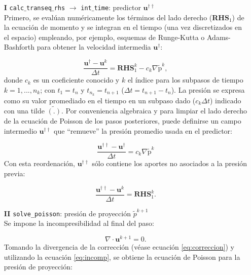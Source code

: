 \begin{enumerate}
\item[\textbf{I}] \texttt{calc$\_$transeq$\_$rhs} $\rightarrow$ \texttt{int$\_$time}: predictor $\mathbf{u}^{\dagger \dagger}$ \\
Primero, se evalúan numéricamente los términos del lado derecho (\textbf{RHS}$_1$) de la ecuación de momento y se integran en el tiempo (una vez discretizados en el espacio) empleando, por ejemplo, esquemas de Runge-Kutta o Adams-Bashforth para obtener la velocidad intermedia $\mathbf{u}^{\dagger}$:

\begin{equation}
\frac{\mathbf{u}^{\dagger} - \mathbf{u}^k}{\Delta t} = \textbf{RHS}_1^k - c_k \nabla \widetilde{\text{p}}^k , 
\end{equation}
donde $c_k$ es un coeficiente conocido y $k$ el índice para los subpasos de tiempo \linebreak $k=1,...,n_k$; con $t_1=t_n$ y $t_{n_k}=t_{n+1}$ ($\Delta t = t_{n+1} - t_{n}$). La presión se expresa \linebreak como su valor promediado en el tiempo en un subpaso dado ($c_k \Delta t$) indicado con una tilde $\widetilde{(\text{.})}$. Por conveniencia algebraica y para limpiar el lado derecho de la ecuación de \linebreak Poisson de los pasos posteriores, puede definirse un campo intermedio $\mathbf{u}^{\dagger \dagger}$ que ``remueve'' la presión promedio usada en el predictor:

\begin{equation}
\frac{\mathbf{u}^{\dagger \dagger} - \mathbf{u}^{\dagger}}{\Delta t} = c_k \nabla \widetilde{\text{p}}^k  
\end{equation}
Con esta reordenación, $\mathbf{u}^{\dagger \dagger}$ sólo contiene los aportes no asociados a la presión previa:

\begin{equation}
\frac{\mathbf{u}^{\dagger \dagger} - \mathbf{u}^{k}}{\Delta t} = \textbf{RHS}_1^k \text{.}  
\end{equation}

\item[\textbf{II}] \texttt{solve\_poisson}: presión de proyección $\widetilde{p}^{k+1}$ \\
Se impone la incompresibilidad al final del paso:
	
\begin{equation}
\nabla \cdot \mathbf{u}^{k+1} = 0.
\label{eq:incomp}
\end{equation}
Tomando la divergencia de la corrección (véase ecuación \ref{eq:correccion}) y utilizando la ecuación \ref{eq:incomp}, se obtiene la ecuación de Poisson para la presión de proyección:


\end{enumerate}
